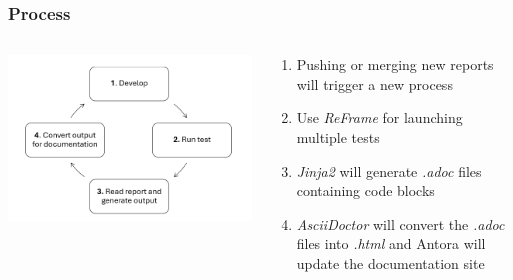 \documentclass[10pt]{beamer}
\begin{document}
\begin{frame}
    \frametitle{\textbf{Process}}
    \begin{columns}
        \begin{column}{0.5\textwidth}
            \includegraphics[width=1.1\textwidth]{../illustrations/process.png}
        \end{column}

        \begin{column}{0.5\textwidth}
            \begin{enumerate}
                \addtolength{\itemsep}{5pt}
                \item Pushing or merging new reports will trigger a new process
                \item Use \textit{ReFrame} for launching multiple tests
                \item \textit{Jinja2} will generate \textit{.adoc} files containing code blocks
                \item \textit{AsciiDoctor} will convert the \textit{.adoc} files into \textit{.html} and Antora will update the documentation site
            \end{enumerate}
        \end{column}
    \end{columns}
\end{frame}
\end{document}
